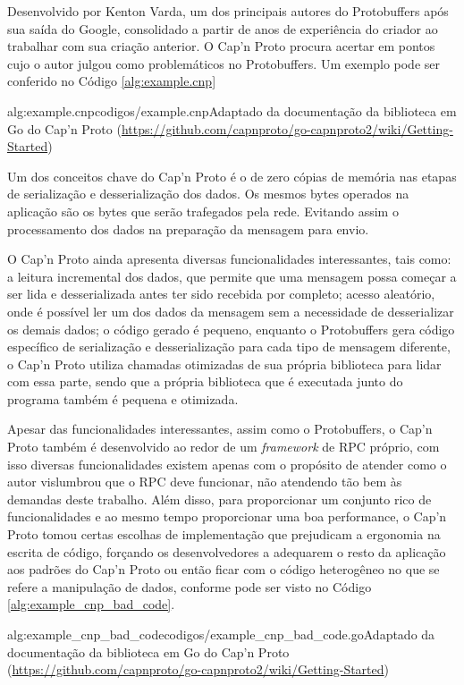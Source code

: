 Desenvolvido por Kenton Varda, um dos principais autores do Protobuffers após sua saída do Google, consolidado a partir de anos de experiência do criador ao trabalhar com sua criação anterior. O Cap'n Proto procura acertar em pontos cujo o autor julgou como problemáticos no Protobuffers. Um exemplo pode ser conferido no Código \ref{alg:example.cnp}

 {alg:example.cnp}{codigos/example.cnp}{Adaptado da documentação da biblioteca em Go do Cap'n Proto (\url{https://github.com/capnproto/go-capnproto2/wiki/Getting-Started})}

Um dos conceitos chave do Cap'n Proto é o de zero cópias de memória nas etapas de serialização e desserialização dos dados. Os mesmos bytes operados na aplicação são os bytes que serão trafegados pela rede. Evitando assim o processamento dos dados na preparação da mensagem para envio.

O Cap'n Proto ainda apresenta diversas funcionalidades interessantes, tais como: a leitura incremental dos dados, que permite que uma mensagem possa começar a ser lida e desserializada antes ter sido recebida por completo; acesso aleatório, onde é possível ler um dos dados da mensagem sem a necessidade de desserializar os demais dados; o código gerado é pequeno, enquanto o Protobuffers gera código específico de serialização e desserialização para cada tipo de mensagem diferente, o Cap'n Proto utiliza chamadas otimizadas de sua própria biblioteca para lidar com essa parte, sendo que a própria biblioteca que é executada junto do programa também é pequena e otimizada.

Apesar das funcionalidades interessantes, assim como o Protobuffers, o Cap'n Proto também é desenvolvido ao redor de um \textit{framework} de RPC próprio, com isso diversas funcionalidades existem apenas com o propósito de atender como o autor vislumbrou que o RPC deve funcionar, não atendendo tão bem às demandas deste trabalho. Além disso, para proporcionar um conjunto rico de funcionalidades e ao mesmo tempo proporcionar uma boa performance, o Cap'n Proto tomou certas escolhas de implementação que prejudicam a ergonomia na escrita de código, forçando os desenvolvedores a adequarem o resto da aplicação aos padrões do Cap'n Proto ou então ficar com o código heterogêneo no que se refere a manipulação de dados, conforme pode ser visto no Código \ref{alg:example_cnp_bad_code}.

 {alg:example_cnp_bad_code}{codigos/example_cnp_bad_code.go}{Adaptado da documentação da biblioteca em Go do Cap'n Proto (\url{https://github.com/capnproto/go-capnproto2/wiki/Getting-Started})}

